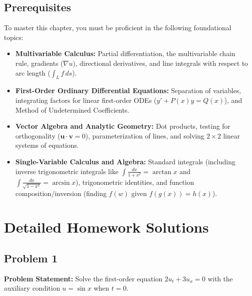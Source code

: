 \documentclass[11pt]{article}
\begin{document}
\subsection{Prerequisites}
To master this chapter, you must be proficient in the following foundational topics:
\begin{itemize}
    \item \textbf{Multivariable Calculus:} Partial differentiation, the multivariable chain rule, gradients ($\nabla u$), directional derivatives, and line integrals with respect to arc length ($\int_L f\,ds$).
    \item \textbf{First-Order Ordinary Differential Equations:} Separation of variables, integrating factors for linear first-order ODEs ($y' + P(x)y = Q(x)$), and Method of Undetermined Coefficients.
    \item \textbf{Vector Algebra and Analytic Geometry:} Dot products, testing for orthogonality ($\mathbf{u} \cdot \mathbf{v} = 0$), parameterization of lines, and solving $2 \times 2$ linear systems of equations.
    \item \textbf{Single-Variable Calculus and Algebra:} Standard integrals (including inverse trigonometric integrals like $\int \frac{dx}{1+x^2} = \arctan x$ and $\int \frac{dx}{\sqrt{1-x^2}} = \arcsin x$), trigonometric identities, and function composition/inversion (finding $f(w)$ given $f(g(x)) = h(x)$).
\end{itemize}

\newpage
\section{Detailed Homework Solutions}

\subsection*{Problem 1}
\textbf{Problem Statement:} Solve the first-order equation $2u_t + 3u_x = 0$ with the auxiliary condition $u = \sin x$ when $t = 0$.
\end{document}
